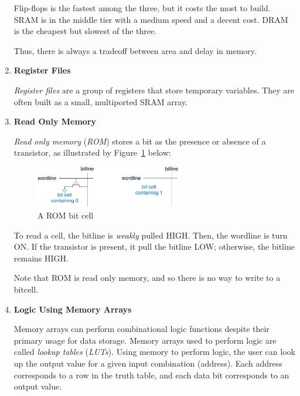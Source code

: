 \documentclass[12pt]{article}
\numberwithin{figure}{subsection}
\numberwithin{table}{subsection}
\numberwithin{equation}{subsection}
\begin{document}
\begin{enumerate}
  Flip-flops is the fastest among the three, but it costs the most to build. SRAM is in the middle tier with a medium speed and a decent cost. DRAM is the cheapest but slowest of the three.

  Thus, there is always a tradeoff between area and delay in memory.

  \item \textbf{Register Files}

  \textit{Register files} are a group of registers that store temporary variables. They are often built as a small, multiported SRAM array.

  \item \textbf{Read Only Memory}

  \textit{Read only memory} (\textit{ROM}) stores a bit as the presence or absence of a transistor, as illustrated by Figure~\ref{fig:rom_bit_cell} below:

  \begin{figure}[ht]
    \centering
    \includegraphics[width=0.6\textwidth]{rom_bit_cell.png}
    \caption{A ROM bit cell}
    \label{fig:rom_bit_cell}
  \end{figure}

  To read a cell, the bitline is \textit{weakly} pulled HIGH. Then, the wordline is turn ON. If the transistor is present, it pull the bitline LOW; otherwise, the bitline remains HIGH.

  Note that ROM is read only memory, and so there is no way to write to a bitcell.

  \item \textbf{Logic Using Memory Arrays}

  Memory arrays can perform combinational logic functions despite their primary usage for data storage. Memory arrays used to perform logic are called \textit{lookup tables} (\textit{LUTs}). Using memory to perform logic, the user can look up the output value for a given input combination (address). Each address corresponds to a row in the truth table, and each data bit corresponds to an output value.
\end{enumerate}
\end{document}
